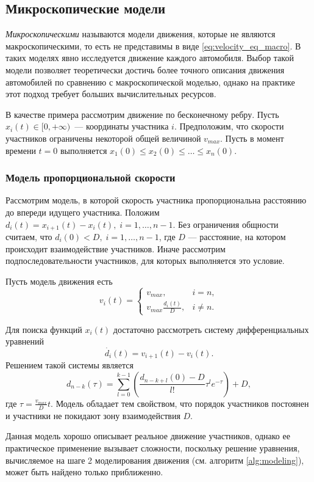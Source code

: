 \documentclass[12pt, a4paper]{article}
\begin{document}
\subsection{Микроскопические модели}
\textit {Микроскопическими} называются модели движения, которые не являются макроскопическими, то есть не представимы в виде \eqref{eq:velocity_eq_macro}. В таких моделях явно исследуется движение каждого автомобиля.
Выбор такой модели позволяет теоретически достичь более точного описания движения автомобилей по сравнению с макроскопической моделью, однако на практике этот подход требует больших вычислительных ресурсов.

В качестве примера рассмотрим движение по бесконечному ребру. Пусть ${x_i(t) \in [0, +\infty)}$~--- координаты участника $i$. Предположим, что скорости участников ограничены некоторой общей величиной $v_{max}$. Пусть в момент времени ${t = 0}$ выполняется $x_1(0) \le x_2(0) \le \dots \le x_n(0)$.

\subsubsection*{Модель пропорциональной скорости}
Рассмотрим модель, в которой скорость участника пропорциональна расстоянию до впереди идущего участника.
Положим $d_{i} (t) = x_{i + 1} (t) - x_{i} (t), \; i = 1, \dots, n - 1$.
Без ограничения общности считаем, что $d_{i} (0) < D, \; i = 1, \dots, n - 1$, где $D$ --- расстояние, на котором происходит взаимодействие участников. Иначе рассмотрим подпоследовательности участников, для которых выполняется это условие.

Пусть модель движения есть
\begin{equation}
	\label{eq:micro}
	v_i(t)=
	\begin{cases}
		v_{max}, & i = n,
		\\
		v_{max} \frac{d_i(t)}{D} ,& i \ne n.
	\end{cases}
\end{equation}

Для поиска функций $x_i(t)$ достаточно рассмотреть систему дифференциальных уравнений
$$ \dot{d_i} (t) = v_{i + 1} (t) - v_i (t).$$
Решением такой системы является
$$d_{n - k} (\tau) = \sum \limits_{l = 0} ^ {k - 1} \left(\frac{d_{n - k + l} (0) - D}{l!} \tau^l e ^ {-\tau}\right) + D ,$$
где ${\tau = \frac{v_{max}}{D}t}$. Модель обладает тем свойством, что порядок участников постоянен и участники не покидают зону взаимодействия $D$. 

Данная модель хорошо описывает реальное движение участников, однако ее практическое применение вызывает сложности, поскольку решение уравнения, вычисляемое на шаге 2 моделирования движения (см. алгоритм \ref{alg:modeling}), может быть найдено только приближенно.
\end{document}
